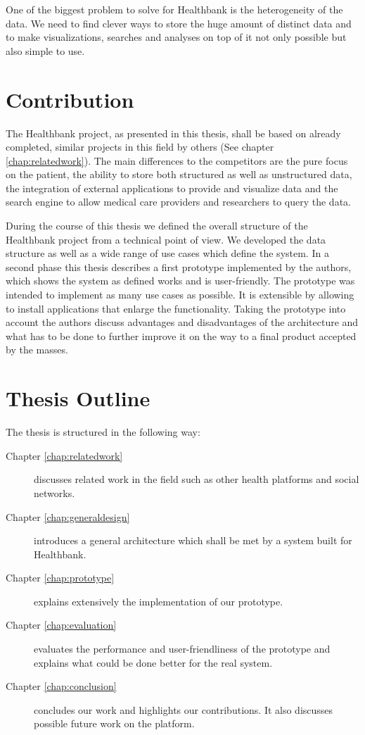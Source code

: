 One of the biggest problem to solve for Healthbank is the heterogeneity of the data. We need to find clever ways to store the huge amount of distinct data and to make visualizations, searches and analyses on top of it not only possible but also simple to use.


\section{Contribution}

The Healthbank project, as presented in this thesis, shall be based on already completed, similar projects in this field by others (See chapter \ref{chap:relatedwork}). The main differences to the competitors are the pure focus on the patient, the ability to store both structured as well as unstructured data, the integration of external applications to provide and visualize data and the search engine to allow medical care providers and researchers to query the data.

During the course of this thesis we defined the overall structure of the Healthbank project from a technical point of view. We developed the data structure as well as a wide range of use cases which define the system. In a second phase this thesis describes a first prototype implemented by the authors, which shows the system as defined works and is user-friendly. The prototype was intended to implement as many use cases as possible. It is extensible by allowing to install applications that enlarge the functionality. Taking the prototype into account the authors discuss advantages and disadvantages of the architecture and what has to be done to further improve it on the way to a final product accepted by the masses.


\section{Thesis Outline}

The thesis is structured in the following way:\newline

\begin{description}
	\item[Chapter \ref{chap:relatedwork}] discusses related work in the field such as other health platforms and social networks.
	\item[Chapter \ref{chap:generaldesign}] introduces a general architecture which shall be met by a system built for Healthbank.
	\item[Chapter \ref{chap:prototype}] explains extensively the implementation of our prototype.
	\item[Chapter \ref{chap:evaluation}] evaluates the performance and user-friendliness of the prototype and explains what could be done better for the real system.
	\item[Chapter \ref{chap:conclusion}] concludes our work and highlights our contributions. It also discusses possible future work on the platform.
\end{description}
